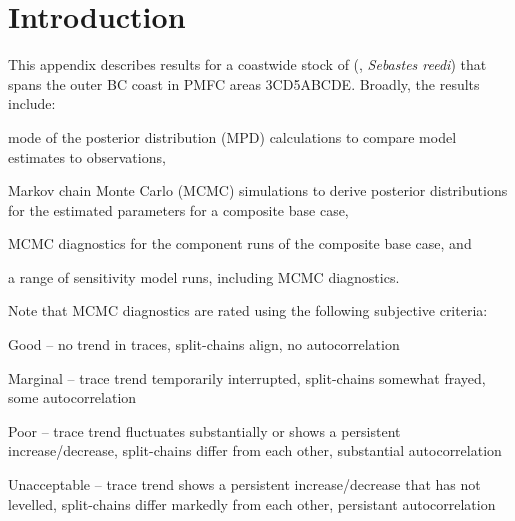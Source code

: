 \documentclass[11pt]{book}
\newcommand{\newstuff}[1]{\normalsize\textcolor{blue}{#1}\normalsize}
\begin{document}
\section{Introduction}


This appendix describes results for a coastwide stock of \SPP{} (\SPC, \emph{Sebastes reedi}) that spans the outer BC coast in PMFC areas 3CD5ABCDE.
Broadly, the results include:
\vspace{-0.5\baselineskip}%
\begin{itemize_csas}
\item mode of the posterior distribution (MPD) calculations to compare model estimates to observations, 
\item Markov chain Monte Carlo (MCMC) simulations to derive posterior distributions for the estimated parameters for a composite base case,
\item MCMC diagnostics for the component runs of the composite base case, and
\item a range of sensitivity model runs, including MCMC diagnostics.
\end{itemize_csas}
Note that MCMC diagnostics are rated using the following subjective criteria:
\begin{itemize_csas}
  \item Good -- no trend in traces, split-chains align, no autocorrelation
  \item Marginal -- trace trend temporarily interrupted, split-chains somewhat frayed, some autocorrelation
  \item Poor -- trace trend fluctuates substantially or shows a persistent increase/decrease, split-chains differ from each other, substantial autocorrelation
  \item Unacceptable -- trace trend shows a persistent increase/decrease that has not levelled, split-chains differ markedly from each other, persistant autocorrelation
\end{itemize_csas}
\end{document}
